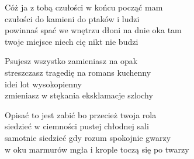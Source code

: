 \begin{text}
    Cóż ja z tobą czułości w końcu począć mam\\
    czułości do kamieni do ptaków i ludzi\\
    powinnaś spać we wnętrzu dłoni na dnie oka tam\\
    twoje miejsce niech cię nikt nie budzi

    Psujesz wszystko zamieniasz na opak\\
    streszczasz tragedię na romans kuchenny\\
    idei lot wysokopienny\\
    zmieniasz w stękania eksklamacje szlochy

    Opisać to jest zabić bo przecież twoja rola\\
    siedzieć w ciemności pustej chłodnej sali\\
    samotnie siedzieć gdy rozum spokojnie gwarzy\\
    w oku marmurów mgła i krople toczą się po twarzy
\end{text}
\begin{chord}

\end{chord}